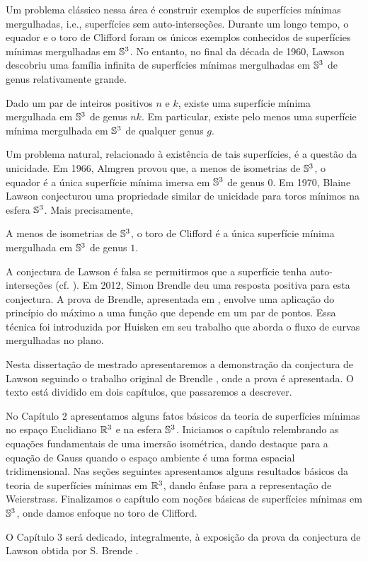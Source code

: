 Um problema cl\'assico nessa \'area \'e construir exemplos
de superf\'icies m\'inimas mergulhadas, i.e., superf\'icies sem 
auto-interse\c c\~oes. Durante um longo tempo, o equador e 
o toro de Clifford foram os \'unicos exemplos conhecidos de 
superf\'icies m\'inimas mergulhadas em $\mathbb{S}^3$. No entanto, 
no final da d\'ecada de 1960, Lawson \cite{Lawson1970} 
descobriu uma fam\'ilia infinita de superf\'icies m\'inimas 
mergulhadas em $\mathbb{S}^3$ de genus relativamente grande.

\begin{teorema} \label{teo:lawson}
	Dado um par de inteiros positivos $n$ e $k$, existe uma superf\'icie
	m\'inima mergulhada em $\mathbb{S}^3$ de genus $nk$. Em particular, 
	existe pelo menos uma superf\'icie m\'inima mergulhada em $\mathbb{S}^3$
	de qualquer genus $g$.
\end{teorema}

Um problema natural, relacionado \`a exist\^encia de tais superf\'icies,
\'e a quest\~ao da unicidade. Em 1966, Almgren \cite{Almgren1966} 
provou que, a menos de isometrias de $\mathbb{S}^3$, o equador \'e a \'unica
superf\'icie m\'inima imersa em $\mathbb{S}^3$ de genus $0$.
Em 1970, Blaine Lawson \cite{Lawson1970a} conjecturou uma 
propriedade similar de unicidade para toros m\'inimos na esfera
$\mathbb{S}^3$. Mais precisamente,

\begin{conjectura}[Lawson]\label{teo:Lawson}
	A menos de isometrias de $\mathbb{S}^3$, o toro de Clifford \'e a \'unica 
	superf\'icie m\'inima mergulhada em $\mathbb{S}^3$ de genus $1$.
\end{conjectura}

A conjectura de Lawson \'e falsa se permitirmos que a superf\'icie
tenha auto-interse\c c\~oes (cf. \cite{Lawson1969}). Em 2012, 
Simon Brendle deu uma resposta positiva para esta conjectura. 
A prova de Brendle, apresentada em \cite{Brendle2013a}, envolve
uma aplica\c c\~ao do princ\'ipio do m\'aximo a uma fun\c c\~ao 
que depende em um par de pontos. Essa t\'ecnica foi introduzida
por Huisken \cite{Huisken1998} em seu trabalho que aborda o 
fluxo de curvas mergulhadas no plano.

Nesta disserta\c c\~ao de mestrado apresentaremos a 
demonstra\c c\~ao da conjectura de Lawson seguindo
o trabalho original de Brendle \cite{Brendle2013a}, onde
a prova \'e apresentada. O texto est\'a dividido em dois
cap\'itulos, que passaremos a descrever.

No Cap\'itulo 2 apresentamos alguns fatos b\'asicos da
teoria de superf\'icies m\'inimas no espa\c co Euclidiano
$\mathbb{R}^3$ e na esfera $\mathbb{S}^3$. Iniciamos o cap\'itulo 
relembrando as equa\c c\~oes fundamentais de uma 
imers\~ao isom\'etrica, dando destaque para a equa\c c\~ao
de Gauss quando o espa\c co ambiente \'e uma forma 
espacial tridimensional. Nas se\c c\~oes seguintes 
apresentamos alguns resultados b\'asicos da teoria de
superf\'icies m\'inimas em $\mathbb{R}^3$, dando \^enfase para
a representa\c c\~ao de Weierstrass. Finalizamos o
cap\'itulo com no\c c\~oes b\'asicas de superf\'icies 
m\'inimas em $\mathbb{S}^3$, onde damos enfoque no toro de
Clifford.

O Cap\'itulo 3 ser\'a dedicado, integralmente, \`a exposi\c c\~ao
da prova da conjectura de Lawson obtida por S. Brende
\cite{Brendle2013a}.
